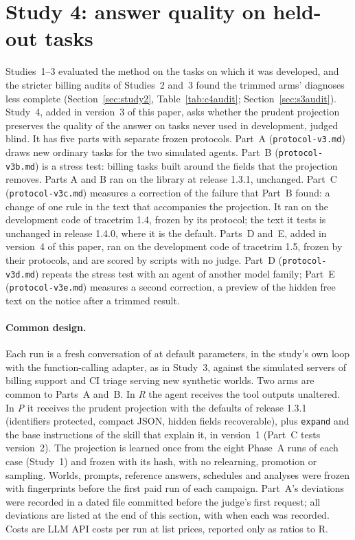 \section{Study 4: answer quality on held-out tasks}
\label{sec:study4}

Studies~1--3 evaluated the method on the tasks on which it was developed, and the stricter billing audits of
Studies~2 and~3 found the trimmed arms' diagnoses less complete (Section~\ref{sec:study2},
Table~\ref{tab:c4audit}; Section~\ref{sec:s3audit}). Study~4, added in version~3 of
this paper, asks whether the prudent projection preserves the quality of the answer on tasks never used in
development, judged blind. It has five parts with separate frozen protocols. Part~A (\texttt{protocol-v3.md})
draws new ordinary tasks for the two simulated agents. Part~B (\texttt{protocol-v3b.md}) is a stress test: billing
tasks built around the fields that the projection removes. Parts A and B ran on the library at release
1.3.1, unchanged. Part~C (\texttt{protocol-v3c.md}) measures a correction of the failure that Part~B found: a
change of one rule in the text that accompanies the projection. It ran on the development code of tracetrim 1.4,
frozen by its protocol; the text it tests is unchanged in release 1.4.0, where it is the default. Parts~D and~E,
added in version~4 of this paper, ran on the development code of tracetrim 1.5, frozen by their protocols, and are
scored by scripts with no judge. Part~D (\texttt{protocol-v3d.md}) repeats the stress test with an agent of another
model family; Part~E (\texttt{protocol-v3e.md}) measures a second correction, a preview of the hidden free text on
the notice after a trimmed result.

\paragraph{Common design.} Each run is a fresh conversation of \texttt{\SfourModel} at default parameters, in the
study's own loop with the function-calling adapter, as in Study~3, against the simulated servers of billing support
and CI triage serving new synthetic worlds. Two arms are common to Parts~A and~B. In \emph{R} the agent receives the
tool outputs unaltered. In \emph{P} it receives the prudent projection with the defaults of release 1.3.1
(identifiers protected, compact JSON, hidden fields recoverable), plus \texttt{expand} and the base instructions
of the skill that explain it, in version~1 (Part~C tests version~2). The projection is learned once from the eight Phase~A runs of each case (Study~1) and frozen with
its hash, with no relearning, promotion or sampling. Worlds, prompts, reference answers, schedules and analyses were
frozen with fingerprints before the first paid run of each campaign. Part~A's deviations were recorded in a dated
file committed before the judge's first request; all deviations are listed at the end of this section, with when
each was recorded. Costs are LLM API costs per run at list prices, reported
only as ratios to R.

